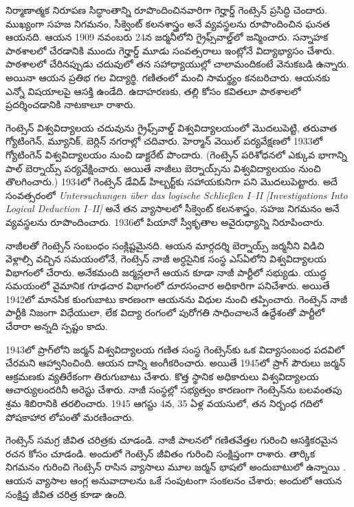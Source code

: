 \documentclass[../../../include/open-logic-section]{subfiles}
\begin{document}



నిర్మాణాత్మక నిరూపణ సిద్ధాంతాన్ని రూపొందించినవారిగా
గెర్హార్డ్ గెంట్సెన్ ప్రసిద్ధి చెందారు. ముఖ్యంగా సహజ నిగమనం,
సీక్వెంట్ కలనశాస్త్రం అనే 
వ్యవస్థలను రూపొందించిన ఘనత ఆయనది. ఆయన 1909 నవంబరు 24న జర్మనీలోని గ్రైఫ్స్‌వాల్డ్‌లో జన్మించారు. సన్నాహక పాఠశాలలో చేరడానికి ముందు గెర్హార్డ్ మూడు
సంవత్సరాలు ఇంట్లోనే విద్యాభ్యాసం చేశారు. పాఠశాలలో చేరినప్పుడు
చదువులో తన సహాధ్యాయుల్లో చాలామందికంటే వెనుకబడి ఉన్నారు.
అయినా ఆయన ప్రతిభ గల విద్యార్థి. గణితంలో మంచి సామర్థ్యం కనబరిచారు. ఆయనకు ఎన్నో విషయాలపై ఆసక్తి ఉండేది. ఉదాహరణకు, తల్లి కోసం కవితలూ పాఠశాలలో ప్రదర్శించడానికి నాటకాలూ రాశారు.

గెంట్సెన్ విశ్వవిద్యాలయ చదువును గ్రైఫ్స్‌వాల్డ్ విశ్వవిద్యాలయంలో మొదలుపెట్టి, తరువాత గ్యోటింగెన్, మ్యూనిక్, బెర్లిన్ నగరాల్లో చదివారు. హెర్మాన్ వెయిల్ పర్యవేక్షణలో 1933లో గ్యోటింగెన్ విశ్వవిద్యాలయం నుంచి డాక్టరేట్ పొందారు. (గెంట్సెన్ పరిశోధనలో ఎక్కువ భాగాన్ని పాల్ బెర్నాయ్స్
పర్యవేక్షించారు. అయితే నాజీలు బెర్నాయ్స్‌ను విశ్వవిద్యాలయం
నుంచి తొలగించారు.) 1934లో గెంట్సెన్ డేవిడ్ హిల్బర్ట్‌కు సహాయకునిగా పని మొదలుపెట్టారు. అదే సంవత్సరంలో \emph{Untersuchungen \"{u}ber das logische Schlie\ss en I--II
  [Investigations Into Logical Deduction I--II]} అనే తన వ్యాసాలలో సీక్వెంట్ కలనశాస్త్రం, సహజ నిగమనం అనే  వ్యవస్థలను రూపొందించారు. 1936లో పియానో స్వీకృతాల అవైరుధ్యాన్ని నిరూపించారు.

నాజీలతో గెంట్సెన్ సంబంధం సంక్లిష్టమైనది. ఆయన మార్గదర్శి బెర్నాయ్స్ జర్మనీని విడిచి వెళ్లాల్సి వచ్చిన సమయంలోనే, గెంట్సెన్ నాజీ అర్ధసైనిక సంస్థ ఎస్‌ఏలోని విశ్వవిద్యాలయ విభాగంలో చేరారు. అనేకమంది జర్మన్లలాగే ఆయన కూడా నాజీ పార్టీలో సభ్యుడు. యుద్ధ సమయంలో వైమానిక గూఢచార విభాగంలో దూరసంచార అధికారిగా పనిచేశారు. అయితే 1942లో మానసిక కుంగుబాటు కారణంగా ఆయనను విధుల నుంచి తప్పించారు. గెంట్సెన్ నాజీ పార్టీకి నిజంగా విధేయులా, లేక విద్యా రంగంలో
పురోగతి సాధించాలనే ఉద్దేశంతో పార్టీలో చేరారా అన్నది స్పష్టం కాదు.

1943లో ప్రాగ్‌లోని జర్మన్ విశ్వవిద్యాలయ గణిత సంస్థ గెంట్సెన్‌కు ఒక విద్యాసంబంధ పదవిలో చేరమని ఆహ్వానించింది. ఆయన దాన్ని అంగీకరించారు. అయితే 1945లో ప్రాగ్ పౌరులు జర్మన్ ఆక్రమణకు వ్యతిరేకంగా తిరుగుబాటు చేశారు. కొత్త స్థానిక అధికారులు విశ్వవిద్యాలయ ఆచార్యులందరినీ అరెస్టు చేశారు. నాజీ సంస్థల్లో సభ్యత్వం కారణంగా గెంట్సెన్‌ను బలవంతపు శ్రమ శిబిరానికి తరలించారు. 1945 ఆగస్టు 4న, 35 ఏళ్ల వయసులో, తన నిర్బంధ గదిలో పోషకాహార లోపంతో మరణించారు.

\begin{reading}
గెంట్సెన్ సమగ్ర జీవిత చరిత్రకు \citet{Menzler-Trott2007} చూడండి. నాజీ పాలనలో గణితవేత్తల గురించి ఆసక్తికరమైన రచన కోసం \citet{Segal2014} చూడండి. అందులో గెంట్సెన్ జీవితం గురించి సంక్షిప్తంగా రాశారు. తార్కిక నిగమనం గురించి గెంట్సెన్ రాసిన వ్యాసాలు మూల జర్మన్ భాషలో అందుబాటులో ఉన్నాయి \citep{Gentzen1935a,Gentzen1935b}. ఆయన వ్యాసాల ఆంగ్ల అనువాదాలను \citet{Gentzen1969} ఒకే సంపుటంగా సంకలనం చేశారు; అందులో ఆయన సంక్షిప్త జీవిత చరిత్ర కూడా ఉంది.
\end{reading}
\end{document}
